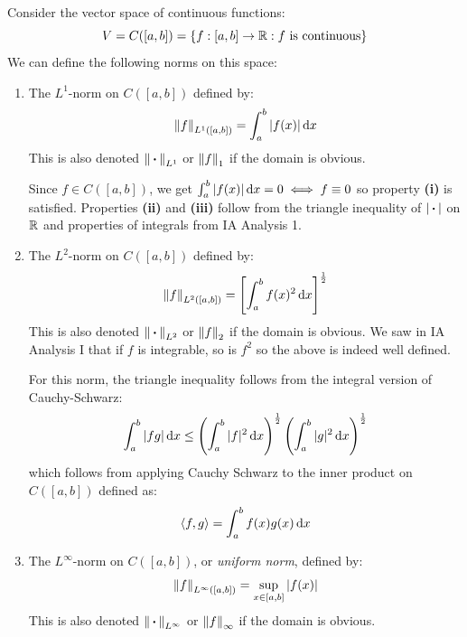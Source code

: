 \documentclass[../main.tex]{subfiles}
\begin{document}
\begin{example}
  Consider the vector space of continuous functions:
  \[
    V = C([a, b]) = \{f: [a, b] \to \mathbb{R}: f \text{ is continuous}\}
  \]
  We can define the following norms on this space:
  \begin{enumerate}
    \item The $L^1$-norm on $C([a, b])$ defined by:
      \[
        \norm{f}_{L^1([a, b])} = \int_{a}^{b} |f(x)| \d{x}
      \]
      This is also denoted $\left\lVert {\hspace{0.18em}\boldsymbol{\cdot}\hspace{0.18em}} \right\rVert_{L^1}$ or $\left\lVert f \right\rVert_1$ if the domain is obvious.

      Since $f \in C([a, b])$, we get $\int_{a}^{b} |f(x)| \d{x} = 0 \iff f \equiv 0$ so property \textbf{(i)} is satisfied.
      Properties \textbf{(ii)} and \textbf{(iii)} follow from the triangle inequality of $|{\hspace{0.18em}\boldsymbol{\cdot}\hspace{0.18em}}|$ on $\mathbb{R}$ and properties of integrals from IA Analysis 1.
    \item The $L^2$-norm on $C([a, b])$ defined by:
      \[
        \norm{f}_{L^2([a, b])} = \left[\int_{a}^{b} f(x)^2 \d{x}\right]^{\frac{1}{2}}
      \]
      This is also denoted $\left\lVert {\hspace{0.18em}\boldsymbol{\cdot}\hspace{0.18em}} \right\rVert_{L^2}$ or $\left\lVert f \right\rVert_2$ if the domain is obvious.
      We saw in IA Analysis I that if $f$ is integrable, so is $f^2$ so the above is indeed well defined.

      For this norm, the triangle inequality follows from the integral version of Cauchy-Schwarz:
      \[
        \int_{a}^{b} |fg| \d{x} \leq \left(\int_{a}^{b} |f|^2 \d{x}\right)^{\frac{1}{2}} \left(\int_{a}^{b} |g|^2 \d{x}\right)^{\frac{1}{2}}
      \]
      which follows from applying Cauchy Schwarz to the inner product on $C([a, b])$ defined as:
      \[
        \langle f, g \rangle = \int_{a}^{b} f(x)g(x) \d{x}
      \]
    \item The $L^\infty$-norm on $C([a, b])$, or \textit{uniform norm}, defined by:
      \[
        \left\lVert f \right\rVert_{L^\infty([a, b])} = \sup_{x \in [a, b]} |f(x)|
      \]
      This is also denoted $\left\lVert {\hspace{0.18em}\boldsymbol{\cdot}\hspace{0.18em}} \right\rVert_{L^\infty}$ or $\left\lVert f \right\rVert_{\infty}$ if the domain is obvious.
  \end{enumerate}
\end{example}
\end{document}
